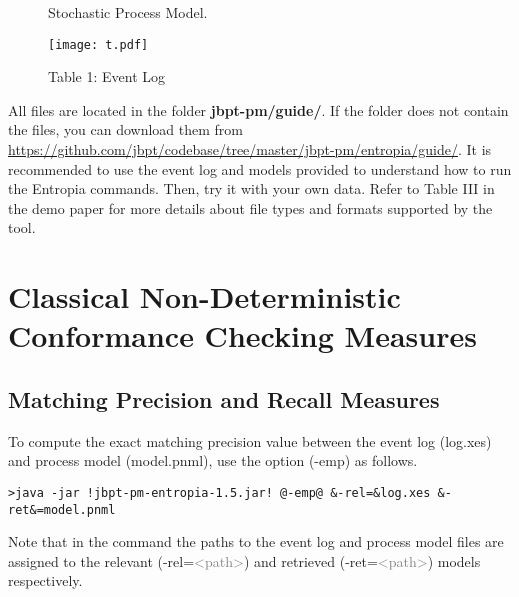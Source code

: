 \documentclass{article}
\begin{document}
\begin{figure}[h!]
\begin{minipage}{0.45\textwidth}
\begin{center}
\vspace{3.5mm}
\caption{Stochastic Process Model.}
\label{fig:SDFA}
\vspace{-10mm}
\end{center}
\end{minipage}

\begin{center}
\vspace{5mm}
\begin{minipage}{0.45\textwidth}
 \centering
\texttt{[image: t.pdf]} 
\caption*{ Table 1: Event Log}
\label{fig:Log}
\end{minipage}
\end{center}
\vspace{-4mm}
\end{figure}

All files are located in the folder \textbf{jbpt-pm\slash guide\slash}. If the folder does not contain the files, you can download them from \url{https://github.com/jbpt/codebase/tree/master/jbpt-pm/entropia/guide/}. It is recommended to use the event log and models provided to understand how to run the Entropia commands. Then, try it with your own data. Refer to Table III in the demo paper for more details about file types and formats supported by the tool.

\section*{Classical Non-Deterministic Conformance Checking Measures}
\setcounter{subsection}{0}
\subsection{Matching Precision and Recall Measures}
To compute the exact matching precision value between the event log (log.xes) and process model  (model.pnml), use the option (\textcolor{darkcandyapplered}{\footnotesize\ttfamily-emp}) as follows.
\begin{lstlisting}[style=CL]
>java -jar !jbpt-pm-entropia-1.5.jar! @-emp@ &-rel=&log.xes &-ret&=model.pnml
\end{lstlisting}
Note that in the command the paths to the event log and process model files are assigned to the relevant (\textcolor{ao}{\footnotesize\ttfamily-rel=}\textcolor{gray}{\footnotesize\ttfamily<path>}) and retrieved (\textcolor{ao}{\footnotesize\ttfamily-ret=}\textcolor{gray}{\footnotesize\ttfamily<path>}) models respectively.\\
\end{document}
